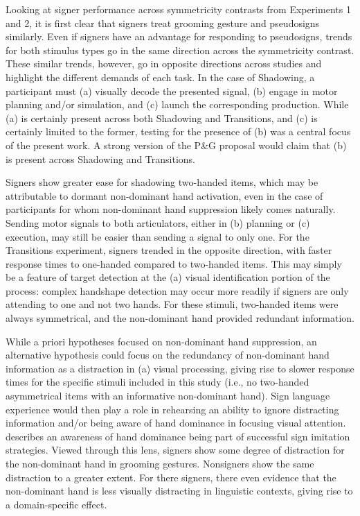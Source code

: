             Looking at signer performance across symmetricity contrasts from Experiments 1 and 2, it is first clear that signers treat grooming gesture and pseudosigns similarly. Even if signers have an advantage for responding to pseudosigns, trends for both stimulus types go in the same direction across the symmetricity contrast.  These similar trends, however, go in opposite directions across studies and highlight the different demands of each task. In the case of Shadowing, a participant must (a) visually decode the presented signal, (b) engage in motor planning and/or simulation, and (c) launch the corresponding production. While (a) is certainly present across both Shadowing and Transitions, and (c) is certainly limited to the former, testing for the presence of (b) was a central focus of the present work. A strong version of the P\&G proposal would claim that (b) is present across Shadowing and Transitions. \par
            Signers show greater ease for shadowing two-handed items, which may be attributable to dormant non-dominant hand activation, even in the case of participants for whom non-dominant hand suppression likely comes naturally. Sending motor signals to both articulators, either in (b) planning or (c) execution, may still be easier than sending a signal to only one. For the Transitions experiment, signers trended in the opposite direction, with faster response times to one-handed compared to two-handed items. This may simply be a feature of target detection at the (a) visual identification portion of the process: complex handshape detection may occur more readily if signers are only attending to one and not two hands. For these stimuli, two-handed items were always symmetrical, and the non-dominant hand provided redundant information. \par
            While a priori hypotheses focused on non-dominant hand suppression, an alternative hypothesis could focus on the redundancy of non-dominant hand information as a distraction in (a) visual processing, giving rise to slower response times for the specific stimuli included in this study (i.e., no two-handed asymmetrical items with an informative non-dominant hand). Sign language experience would then play a role in rehearsing an ability to ignore distracting information and/or being aware of hand dominance in focusing visual attention.  describes an awareness of hand dominance being part of successful sign imitation strategies. Viewed through this lens, signers show some degree of distraction for the non-dominant hand in grooming gestures. Nonsigners show the same distraction to a greater extent. For there signers, there even evidence that the non-dominant hand is less visually distracting in linguistic contexts, giving rise to a domain-specific effect. \par
